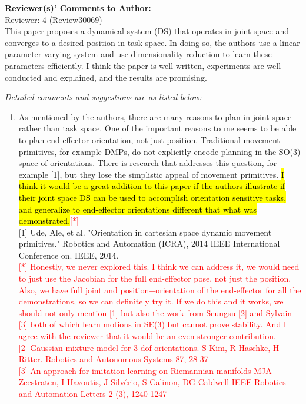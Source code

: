 \documentclass[10pt,stdletter,dateno]{newlfm}
\begin{document}
\begin{newlfm}

\textbf{Reviewer(s)' Comments to Author:}\\

\underline{Reviewer: 4 (Review30069)}\\
This paper proposes a dynamical system (DS) that operates in joint
space and converges to a desired position in task space. In doing so,
the authors use a linear parameter varying system and use
dimensionality reduction to learn these parameters efficiently. I think
the paper is well written, experiments are well conducted and
explained, and the results are promising. 

\textit{Detailed comments and
suggestions are as listed below:}
\begin{enumerate}
\item As mentioned by the authors, there are many reasons to plan in joint
space rather than task space. One of the important reasons to me seems
to be able to plan end-effector orientation, not just position.
Traditional movement primitives, for example DMPs, do not explicitly
encode planning in the SO(3) space of orientations. There is research
that addresses this question, for example [1], but they lose the
simplistic appeal of movement primitives. \hl{I think it would be a great
addition to this paper if the authors illustrate if their joint space
DS can be used to accomplish orientation sensitive tasks, and
generalize to end-effector orientations different that what was
demonstrated.}\textcolor{red}{[*]} \\

[1] Ude, Ale, et al. "Orientation in cartesian space dynamic movement
primitives." Robotics and Automation (ICRA), 2014 IEEE International
Conference on. IEEE, 2014.\\

\textcolor{red}{[*] Honestly, we never explored this. I think we can address it, we would need to just use the Jacobian for the full end-effector pose, not just the position. Also, we have full joint and position+orientation of the end-effector for all the demonstrations, so we can definitely try it. If we do this and it works, we should not only mention [1] but also the work from Seungsu [2] and Sylvain [3] both of which learn motions in SE(3) but cannot prove stability. And I agree with the reviewer that it would be an even stronger contribution.}\\
\textcolor{red}{[2] Gaussian mixture model for 3-dof orientations. S Kim, R Haschke, H Ritter. Robotics and Autonomous Systems 87, 28-37}\\
\textcolor{red}{[3] An approach for imitation learning on Riemannian manifolds
MJA Zeestraten, I Havoutis, J Silvério, S Calinon, DG Caldwell
IEEE Robotics and Automation Letters 2 (3), 1240-1247}\\


\end{enumerate}
\end{newlfm}
\end{document}
